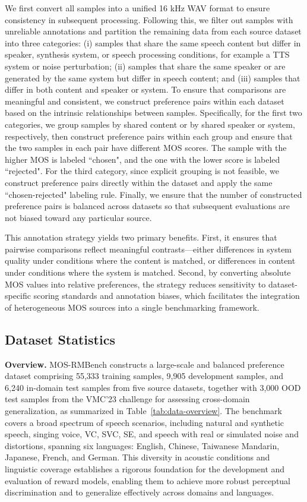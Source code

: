We first convert all samples into a unified 16 kHz WAV format to ensure consistency in subsequent processing. Following this, we filter out samples with unreliable annotations and partition the remaining data from each source dataset into three categories: (i) samples that share the same speech content but differ in speaker, synthesis system, or speech processing conditions, for example a TTS system or noise perturbation; (ii) samples that share the same speaker or are generated by the same system but differ in speech content; and (iii) samples that differ in both content and speaker or system. To ensure that comparisons are meaningful and consistent, we construct preference pairs within each dataset based on the intrinsic relationships between samples. Specifically, for the first two categories, we group samples by shared content or by shared speaker or system, respectively, then construct preference pairs within each group and ensure that the two samples in each pair have different MOS scores. The sample with the higher MOS is labeled ``chosen", and the one with the lower score is labeled ``rejected". For the third category, since explicit grouping is not feasible, we construct preference pairs directly within the dataset and apply the same ``chosen-rejected" labeling rule. 
Finally, we ensure that the number of constructed preference pairs is balanced across datasets so that subsequent evaluations are not biased toward any particular source.

This annotation strategy yields two primary benefits. First, it ensures that pairwise comparisons reflect meaningful contrasts—either differences in system quality under conditions where the content is matched, or differences in content under conditions where the system is matched. 
Second, by converting absolute MOS values into relative preferences, the strategy reduces sensitivity to dataset-specific scoring standards and annotation biases, which facilitates the integration of heterogeneous MOS sources into a single benchmarking framework.


\subsection{Dataset Statistics}
\textbf{Overview.}
MOS-RMBench constructs a large-scale and balanced preference dataset comprising 55,333 training samples, 9,905 development samples, and 6,240 in-domain test samples from five source datasets, together with 3,000 OOD test samples from the VMC'23 challenge for assessing cross-domain generalization, as summarized in Table~\ref{tab:data-overview}.
The benchmark covers a broad spectrum of speech scenarios, including natural and synthetic speech, singing voice, VC, SVC, SE, and speech with real or simulated noise and distortions, spanning six languages: English, Chinese, Taiwanese Mandarin, Japanese, French, and German.
This diversity in acoustic conditions and linguistic coverage establishes a rigorous foundation for the development and evaluation of reward models, enabling them to achieve more robust perceptual discrimination and to generalize effectively across domains and languages.

